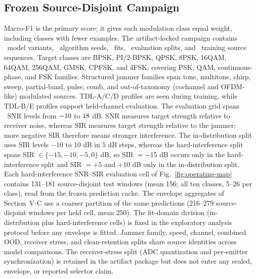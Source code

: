 \documentclass[letterpaper,journal]{IEEEtran}
\begin{document}
\subsection{Frozen Source-Disjoint Campaign}
Macro-F1 is the primary score; it gives each modulation class equal weight,
including classes with fewer examples.
The artifact-locked campaign contains \ProtocolModelCount\ model variants,
\ProtocolSeedCount\ algorithm seeds, \ProtocolFitCount\ fits,
\ProtocolSplitCount\ evaluation splits, and \ProtocolTrainSources\ training
source sequences. Target classes are BPSK, PI/2-BPSK, QPSK, 8PSK, 16QAM, 64QAM, 256QAM, GMSK,
CPFSK, and 4FSK, covering PSK, QAM, continuous-phase, and FSK families.
Structured jammer families span tone, multitone, chirp, sweep, partial-band,
pulse, comb, and out-of-taxonomy (cochannel and OFDM-like) modulated sources. TDL-A/C/D
profiles are seen during training, while TDL-B/E profiles support held-channel
evaluation. The evaluation grid spans \SnrGridCount\ SNR levels from
$-10$ to $18$ dB. SNR measures target strength relative to
receiver noise, whereas SIR measures target strength relative to the jammer;
more negative SIR therefore means stronger interference. The in-distribution split uses SIR levels
$-10$ to $10$ dB in $5$ dB steps, whereas the hard-interference split spans
SIR $\in\{-15,-10,-5,0\}$ dB, so SIR $=-15$ dB occurs only in the
hard-interference split and SIR $=+5$ and $+10$ dB only in the in-distribution
split. Each hard-interference SNR--SIR evaluation cell of
Fig.~\ref{fig:operating-map} contains 131--181 \mbox{source-disjoint} test windows
(mean 156; all ten classes, 5--26 per class), read from the frozen prediction
cache. The envelope aggregates of Section~V-C use a coarser partition of the
same predictions (216--279 \mbox{source-disjoint} windows per held cell, mean 250). The fit-domain division
(in-distribution plus hard-interference cells) is fixed in the exploratory
analysis protocol before any envelope is fitted. Jammer family, speed, channel, combined OOD, receiver stress, and
clean-retention splits share source identities across model comparisons. The
receiver-stress split (ADC quantization and per-emitter synchronization) is
retained in the artifact package but does not enter any sealed, envelope, or
reported selector claim.
\end{document}
